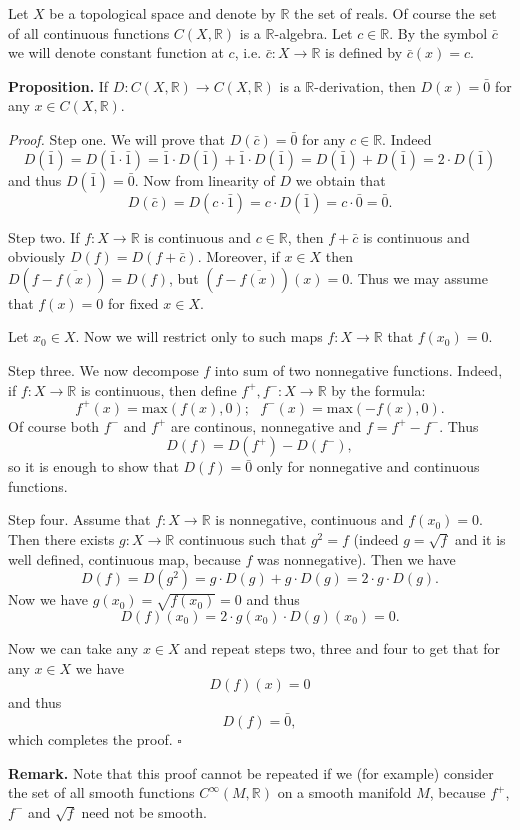 \documentclass[12pt]{article}
\begin{document}
Let $X$ be a topological space and denote by $\mathbb{R}$ the set of reals. Of course the set of all continuous functions $C(X,\mathbb{R})$ is a $\mathbb{R}$-algebra. Let $c\in\mathbb{R}$. By the symbol $\bar{c}$ we will denote constant function at $c$, i.e. $\bar{c}:X\to\mathbb{R}$ is defined by $\bar{c}(x)=c$.

\textbf{Proposition.} If $D:C(X,\mathbb{R})\to C(X,\mathbb{R})$ is a $\mathbb{R}$-derivation, then $D(x)=\bar{0}$ for any $x\in C(X,\mathbb{R})$.

\textit{Proof.} Step one. We will prove that $D(\bar{c})=\bar{0}$ for any $c\in\mathbb{R}$. Indeed $$D(\bar{1})=D(\bar{1}\cdot \bar{1})=\bar{1}\cdot D(\bar{1})+\bar{1}\cdot D(\bar{1})=D(\bar{1})+D(\bar{1})=2\cdot D(\bar{1})$$
and thus $D(\bar{1})=\bar{0}$. Now from linearity of $D$ we obtain that $$D(\bar{c})=D(c\cdot\bar{1})=c\cdot D(\bar{1})=c\cdot\bar{0}=\bar{0}.$$ 

Step two. If $f:X\to\mathbb{R}$ is continuous and $c\in\mathbb{R}$, then $f+\bar{c}$ is continuous and obviously $D(f)=D(f+\bar{c}).$ Moreover, if $x\in X$ then $D(f-\overline{f(x)})=D(f)$, but $(f-\overline{f(x)})(x)=0$. Thus we may assume that $f(x)=0$ for fixed $x\in X$.

Let $x_0\in X$. Now we will restrict only to such maps $f:X\to\mathbb{R}$ that $f(x_0)=0$.

Step three. We now decompose $f$ into sum of two nonnegative functions. Indeed, if $f:X\to\mathbb{R}$ is continuous, then define $f^{+},f^{-}:X\to\mathbb{R}$ by the formula:
$$f^{+}(x)=\mathrm{max}(f(x),0);\ \ \ f^{-}(x)=\mathrm{max}(-f(x),0).$$
Of course both $f^{-}$ and $f^{+}$ are continous, nonnegative and $f=f^{+}-f^{-}$. Thus $$D(f)=D(f^{+})-D(f^{-}),$$ so it is enough to show that $D(f)=\bar{0}$ only for nonnegative and continuous functions.

Step four. Assume that $f:X\to\mathbb{R}$ is nonnegative, continuous and $f(x_0)=0$. Then there exists $g:X\to\mathbb{R}$ continuous such that $g^2=f$ (indeed $g=\sqrt{f}$ and it is well defined, continuous map, because $f$ was nonnegative). Then we have $$D(f)=D(g^2)=g\cdot D(g)+g\cdot D(g)=2\cdot g\cdot D(g).$$ Now we have $g(x_0)=\sqrt{f(x_0)}=0$ and thus $$D(f)(x_0)=2\cdot g(x_0)\cdot D(g)(x_0)=0.$$

Now we can take any $x\in X$ and repeat steps two, three and four to get that for any $x\in X$ we have $$D(f)(x)=0$$ and thus $$D(f)=\bar{0},$$ which completes the proof. $\square$

\textbf{Remark.} Note that this proof cannot be repeated if we (for example) consider the set of all smooth functions $C^{\infty}(M,\mathbb{R})$ on a smooth manifold $M$, because $f^{+}$, $f^{-}$ and $\sqrt{f}$ need not be smooth.
\end{document}
